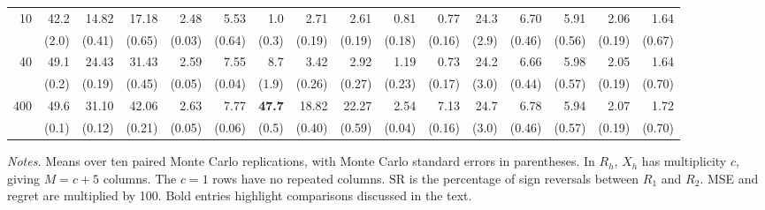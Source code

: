 \documentclass[12pt]{article}
\newcommand{\legend}[1]{\par\medskip\begin{minipage}{\linewidth}\footnotesize \textit{Notes.} #1 \end{minipage}}
\begin{document}
\begin{table}[p]
{\begin{minipage}{\linewidth}
{\begin{tabular}{@{}r*{5}{r}@{\hspace{10pt}}*{5}{r}@{\hspace{10pt}}*{5}{r}@{}}
10 & 42.2 & 14.82 & 17.18 & 2.48 & 5.53 & 1.0 & 2.71 & 2.61 & 0.81 & 0.77 & 24.3 & 6.70 & 5.91 & 2.06 & 1.64\\[-3pt]
 & {\scriptsize (2.0)} & {\scriptsize (0.41)} & {\scriptsize (0.65)} & {\scriptsize (0.03)} & {\scriptsize (0.64)} & {\scriptsize (0.3)} & {\scriptsize (0.19)} & {\scriptsize (0.19)} & {\scriptsize (0.18)} & {\scriptsize (0.16)} & {\scriptsize (2.9)} & {\scriptsize (0.46)} & {\scriptsize (0.56)} & {\scriptsize (0.19)} & {\scriptsize (0.67)}\\[3pt]
40 & 49.1 & 24.43 & 31.43 & 2.59 & 7.55 & 8.7 & 3.42 & 2.92 & 1.19 & 0.73 & 24.2 & 6.66 & 5.98 & 2.05 & 1.64\\[-3pt]
 & {\scriptsize (0.2)} & {\scriptsize (0.19)} & {\scriptsize (0.45)} & {\scriptsize (0.05)} & {\scriptsize (0.04)} & {\scriptsize (1.9)} & {\scriptsize (0.26)} & {\scriptsize (0.27)} & {\scriptsize (0.23)} & {\scriptsize (0.17)} & {\scriptsize (3.0)} & {\scriptsize (0.44)} & {\scriptsize (0.57)} & {\scriptsize (0.19)} & {\scriptsize (0.70)}\\[3pt]
400 & 49.6 & 31.10 & 42.06 & 2.63 & 7.77 & \textbf{47.7} & 18.82 & 22.27 & 2.54 & 7.13 & 24.7 & 6.78 & 5.94 & 2.07 & 1.72\\[-3pt]
 & {\scriptsize (0.1)} & {\scriptsize (0.12)} & {\scriptsize (0.21)} & {\scriptsize (0.05)} & {\scriptsize (0.06)} & {\scriptsize (0.5)} & {\scriptsize (0.40)} & {\scriptsize (0.59)} & {\scriptsize (0.04)} & {\scriptsize (0.16)} & {\scriptsize (3.0)} & {\scriptsize (0.46)} & {\scriptsize (0.57)} & {\scriptsize (0.19)} & {\scriptsize (0.70)}\\
\bottomrule
\end{tabular}}
\ifdim\wd\mcgridbody>\linewidth
  \PackageError{mcgrid}{Simulation table width (\the\wd\mcgridbody) exceeds the page width (\the\linewidth)}{Reduce table spacing.}
\fi
\usebox{\mcgridbody}
\legend{Means over ten paired Monte Carlo replications, with Monte Carlo standard errors in parentheses. In \(R_h\), \(X_h\) has multiplicity \(c\), giving \(M=c+5\) columns. The \(c=1\) rows have no repeated columns. \(\mathrm{SR}\) is the percentage of sign reversals between \(R_1\) and \(R_2\). MSE and regret are multiplied by 100. Bold entries highlight comparisons discussed in the text.}
\end{minipage}}
\ifdim\dimexpr\ht\mcgridpage+\dp\mcgridpage\relax>\textheight
  \PackageError{mcgrid}{Simulation table height (\the\dimexpr\ht\mcgridpage+\dp\mcgridpage\relax) exceeds the page height (\the\textheight)}{Reduce table spacing.}
\fi
\usebox{\mcgridpage}
\end{table}
\end{document}
